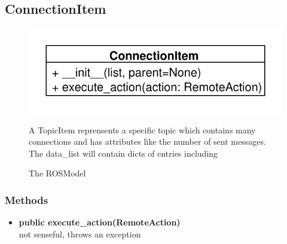 \subsection{ConnectionItem}
\begin{figure}[htbp]
	\begin{minipage}[t]{7cm}
		\vspace{0pt}
		\centering
		\includegraphics[scale=0.6]{./diagram_pictures/ConnectionItem.pdf}
		\caption{The ROSModel}
	\end{minipage}
	\hfill
	\begin{minipage}[t]{8cm}
		\vspace{10pt}
		A TopicItem reprensents a specific topic which contains many connections and has attributes like the number of sent messages.
		The data\_list will contain dicts of entries including 
	\end{minipage}
\end{figure}  
\subsubsection{Methods}
\begin{itemize}
  \item \textbf{public execute\_action(RemoteAction)}\\ 
  not senseful, throws an exception
\end{itemize}


